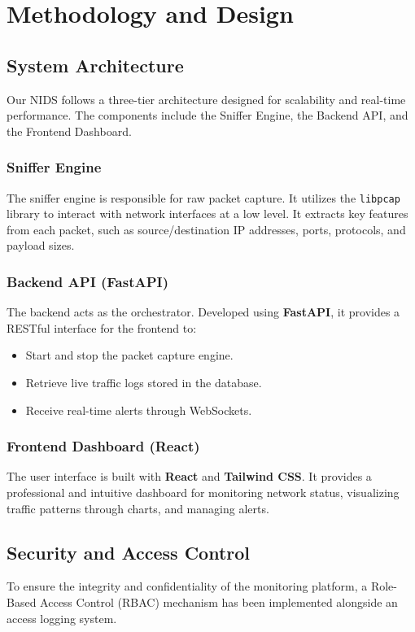 \chapter{Methodology and Design}
\label{chap:methodology}

\section{System Architecture}
Our NIDS follows a three-tier architecture designed for scalability and real-time performance. The components include the Sniffer Engine, the Backend API, and the Frontend Dashboard.

\subsection{Sniffer Engine}
The sniffer engine is responsible for raw packet capture. It utilizes the \texttt{libpcap} library to interact with network interfaces at a low level. It extracts key features from each packet, such as source/destination IP addresses, ports, protocols, and payload sizes.

\subsection{Backend API (FastAPI)}
The backend acts as the orchestrator. Developed using \textbf{FastAPI}, it provides a RESTful interface for the frontend to:
\begin{itemize}
    \item Start and stop the packet capture engine.
    \item Retrieve live traffic logs stored in the database.
    \item Receive real-time alerts through WebSockets.
\end{itemize}

\subsection{Frontend Dashboard (React)}
The user interface is built with \textbf{React} and \textbf{Tailwind CSS}. It provides a professional and intuitive dashboard for monitoring network status, visualizing traffic patterns through charts, and managing alerts.

\section{Security and Access Control}
To ensure the integrity and confidentiality of the monitoring platform, a Role-Based Access Control (RBAC) mechanism has been implemented alongside an access logging system.

